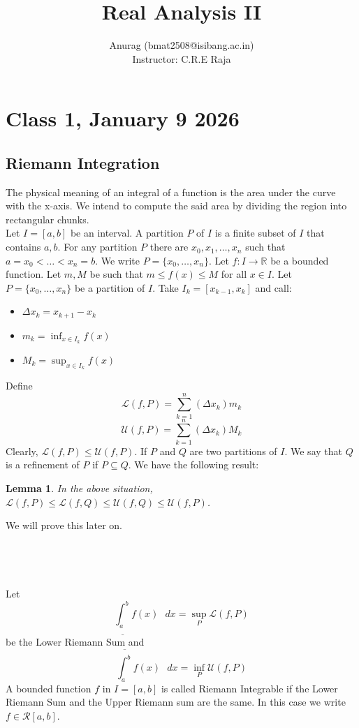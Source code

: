\documentclass{article}
\title{Real Analysis II}
\author{
\begin{tabular}{c}
Anurag (bmat2508@isibang.ac.in)\\[0.6em]
Instructor: C.R.E Raja
\end{tabular}
}
\date{}
\newtheorem{lemma}{Lemma}
\begin{document}
\maketitle
\section*{Class 1, January 9 2026}
\subsection{Riemann Integration}
The physical meaning of an integral of a function is the area under the curve with the x-axis. 
We intend to compute the said area by dividing the region into rectangular chunks.\\
Let $I=[a,b]$ be an interval. A partition $P$ of $I$ is a finite subset of $I$ that contains $a,b$.
For any partition $P$ there are $x_0,x_1,\dots,x_n$ such that \\$a=x_0<\dots<x_n=b$. We write $P=\{x_0,\dots,x_n\}$.
Let $f:I\to \mathbb{R}$ be a bounded function. Let $m,M$ be such that $m\leq f(x)\leq M$ for all $x\in I$. Let $P=\{x_0,\dots,x_n\}$ be a partition of $I$. 
Take $I_k=[x_{k-1},x_k]$ and call:
\begin{itemize}
\item $\Delta x_k=x_{k+1}-x_k$
\item $m_k=\inf_{x\in I_k}f(x)$
\item $M_k=\sup_{x\in I_k}f(x)$
\end{itemize}
Define $$\mathcal{L}(f,P)=\sum_{k=1}^{n}(\Delta x_k)m_k$$
$$\mathcal{U}(f,P)=\sum_{k=1}^{n}(\Delta x_k)M_k$$
Clearly, $\mathcal{L}(f,P)\leq \mathcal{U}(f,P)$. If $P$ and $Q$ are two partitions of $I$. We say that $Q$ is a refinement of $P$ if $P\subseteq Q$. We have the following result:
\begin{lemma}
In the above situation, $\mathcal{L}(f,P)\leq \mathcal{L}(f,Q)\leq \mathcal{U}(f,Q)\leq \mathcal{U}(f,P)$.
\end{lemma}
We will prove this later on.\\ \\ \\ \\ \\
Let $$\underline{\int_a^b}f(x)\text{ }dx=\sup_{P}\mathcal{L}(f,P)$$ be the Lower Riemann Sum and 
$$\overline{\int_a^b}f(x)\text{ }dx=\inf_{P}\mathcal{U}(f,P)$$
A bounded function $f$ in $I=[a,b]$ is called Riemann Integrable if the Lower Riemann Sum and the Upper Riemann sum are the same. In this 
case we write $f\in \mathcal{R}[a,b]$.\\
\end{document}
